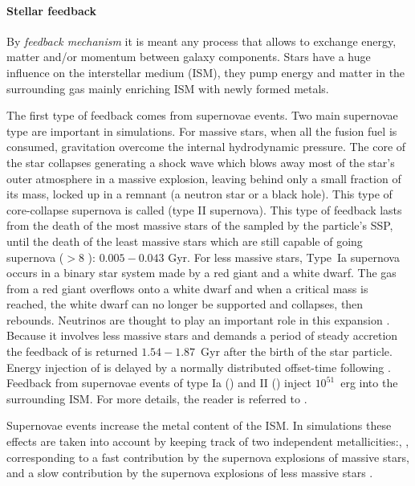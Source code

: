 \paragraph{Stellar feedback}
By \emph{feedback mechanism} it is meant any process that allows to exchange energy, matter and/or momentum between galaxy components. Stars have a huge influence on the interstellar medium (ISM), they pump energy and matter in the surrounding gas mainly enriching ISM with newly formed metals.

The first type of feedback comes from supernovae events. Two main supernovae type are important in simulations. For massive stars, when all the fusion fuel is consumed, gravitation overcome the internal hydrodynamic pressure. The core of the star collapses generating a shock wave which blows away most of the star's outer atmosphere in a massive explosion, leaving behind only a small fraction of its mass, locked up in a remnant (a neutron star or a black hole). This type of core-collapse supernova is called \snii{} (type II supernova).
This type of feedback lasts from the death of the most massive stars of the sampled by the particle's SSP, until the death of the least massive stars which are still capable of going supernova ($>8$ \Msun ): $0.005 - 0.043$ Gyr.
For less massive stars, Type~Ia supernova occurs in a binary star system made by a red giant and a white dwarf.
The gas from a red giant overflows onto a white dwarf and when a critical mass is reached, the white dwarf can no longer be supported and collapses, then rebounds. Neutrinos are thought to play an important role in this expansion \citep{Wongwathanarat2017}.
Because it involves less massive stars and demands a period of steady accretion the feedback of \snia{} is returned $1.54 − 1.87$~Gyr after the birth of the star particle. Energy injection of \snia{} is delayed by a normally distributed offset-time following \citet{Strolger2004}.
Feedback from supernovae events of type Ia (\snia) and II (\snii) inject $10^{51}$~erg into the surrounding ISM. For more details, the reader is referred to \cite{Valcke2008}.


Supernovae events increase the metal content of the ISM. %
In simulations these effects are taken into account by keeping track of two independent metallicities:\feh, \mgfe, corresponding to a fast contribution by the supernova explosions of massive stars, and a slow contribution by the supernova explosions of less massive stars \citep{DeRijcke2013, Vandenbroucke2016}.

